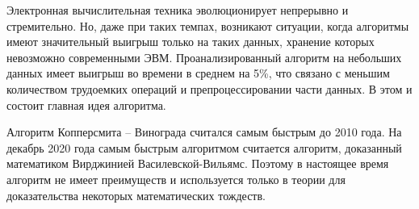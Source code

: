 Электронная вычислительная техника эволюционирует непрерывно и стремительно. Но, даже при таких темпах, возникают ситуации, когда алгоритмы имеют значительный выигрыш только на таких данных, хранение которых невозможно современными ЭВМ. 
Проанализированный алгоритм на небольших данных имеет выигрыш во времени в среднем на 5\%, что связано с меньшим количеством трудоемких операций и препроцессировании части данных. В этом и состоит главная идея алгоритма.  

Алгоритм Копперсмита -- Винограда считался самым быстрым до 2010 года. На декабрь 2020 года самым быстрым алгоритмом считается алгоритм, доказанный математиком Вирджинией Василевской-Вильямс\cite{faster}. Поэтому в настоящее время алгоритм не имеет преимуществ и используется только в теории для доказательства некоторых математических тождеств. 